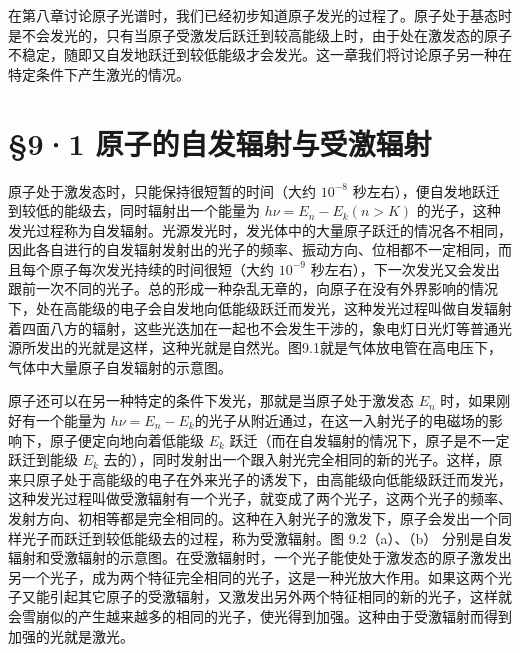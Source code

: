 在第八章讨论原子光谱时，我们已经初步知道原子发光的过程了。原子处于基态时是不会发光的，只有当原子受激发后跃迁到较高能级上时，由于处在激发态的原子不稳定，随即又自发地跃迁到较低能级才会发光。这一章我们将讨论原子另一种在特定条件下产生激光的情况。

\section{§9·1
原子的自发辐射与受激辐射}

原子处于激发态时，只能保持很短暂的时间（大约 \(10^{-8}\)
秒左右），便自发地跃迁到较低的能级去，同时辐射出一个能量为
\(h\nu = E_{n} - E_{k}(n > K)\)
的光子，这种发光过程称为自发辐射。光源发光时，发光体中的大量原子跃迁的情况各不相同，因此各自进行的自发辐射发射出的光子的频率、振动方向、位相都不一定相同，而且每个原子每次发光持续的时间很短（大约
\(10^{-9}\)
秒左右），下一次发光又会发出跟前一次不同的光子。总的形成一种杂乱无章的，向原子在没有外界影响的情况下，处在高能级的电子会自发地向低能级跃迁而发光，这种发光过程叫做自发辐射着四面八方的辐射，这些光迭加在一起也不会发生干涉的，象电灯日光灯等普通光源所发出的光就是这样，这种光就是自然光。图9.1就是气体放电管在高电压下，气体中大量原子自发辐射的示意图。

原子还可以在另一种特定的条件下发光，那就是当原子处于激发态 \(E_{n}\)
时，如果刚好有一个能量为
\(h\nu = E_{n} - E_{k}\)的光子从附近通过，在这一入射光子的电磁场的影响下，原子便定向地向着低能级
\(E_{k}\) 跃迁（而在自发辐射的情况下，原子是不一定跃迁到能级 \(E_{k}\)
去的），同时发射出一个跟入射光完全相同的新的光子。这样，原来只原子处于高能级的电子在外来光子的诱发下，由高能级向低能级跃迁而发光，这种发光过程叫做受激辐射有一个光子，就变成了两个光子，这两个光子的频率、发射方向、初相等都是完全相同的。这种在入射光子的激发下，原子会发出一个同样光子而跃迁到较低能级去的过程，称为受激辐射。图
9.2（a）、（b）
分别是自发辐射和受激辐射的示意图。在受激辐射时，一个光子能使处于激发态的原子激发出另一个光子，成为两个特征完全相同的光子，这是一种光放大作用。如果这两个光子又能引起其它原子的受激辐射，又激发出另外两个特征相同的新的光子，这样就会雪崩似的产生越来越多的相同的光子，使光得到加强。这种由于受激辐射而得到加强的光就是激光。

